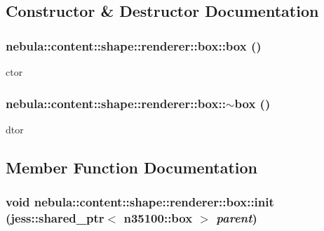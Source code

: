 \subsection{Constructor \& Destructor Documentation}
\hypertarget{classnebula_1_1content_1_1shape_1_1renderer_1_1box_af39f8b59be77155d02a1636b81b55da6}{
\subsubsection[{box}]{\setlength{\rightskip}{0pt plus 5cm}nebula::content::shape::renderer::box::box ()}}
\label{classnebula_1_1content_1_1shape_1_1renderer_1_1box_af39f8b59be77155d02a1636b81b55da6}


ctor \hypertarget{classnebula_1_1content_1_1shape_1_1renderer_1_1box_afe87eb7519a8e048558a861d9cf2eb77}{
\subsubsection[{$\sim$box}]{\setlength{\rightskip}{0pt plus 5cm}nebula::content::shape::renderer::box::$\sim$box ()}}
\label{classnebula_1_1content_1_1shape_1_1renderer_1_1box_afe87eb7519a8e048558a861d9cf2eb77}


dtor 

\subsection{Member Function Documentation}
\hypertarget{classnebula_1_1content_1_1shape_1_1renderer_1_1box_a03626525c89e34ff6616512050c66ac8}{
\subsubsection[{init}]{\setlength{\rightskip}{0pt plus 5cm}void nebula::content::shape::renderer::box::init (jess::shared\_\-ptr$<$ {\bf n35100::box} $>$ {\em parent})}}
\label{classnebula_1_1content_1_1shape_1_1renderer_1_1box_a03626525c89e34ff6616512050c66ac8}


